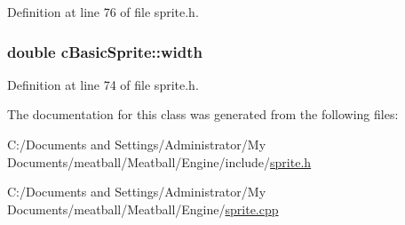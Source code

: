 Definition at line 76 of file sprite.\-h.

\hypertarget{classc_basic_sprite_a99d40d0360fb5a3791c62240d65b677c}{
\subsubsection[{width}]{\setlength{\rightskip}{0pt plus 5cm}double c\-Basic\-Sprite\-::width}}\label{classc_basic_sprite_a99d40d0360fb5a3791c62240d65b677c}


Definition at line 74 of file sprite.\-h.



The documentation for this class was generated from the following files\-:\begin{DoxyCompactItemize}
\item 
C\-:/\-Documents and Settings/\-Administrator/\-My Documents/meatball/\-Meatball/\-Engine/include/\hyperlink{_engine_2include_2sprite_8h}{sprite.\-h}\item 
C\-:/\-Documents and Settings/\-Administrator/\-My Documents/meatball/\-Meatball/\-Engine/\hyperlink{_engine_2sprite_8cpp}{sprite.\-cpp}\end{DoxyCompactItemize}
